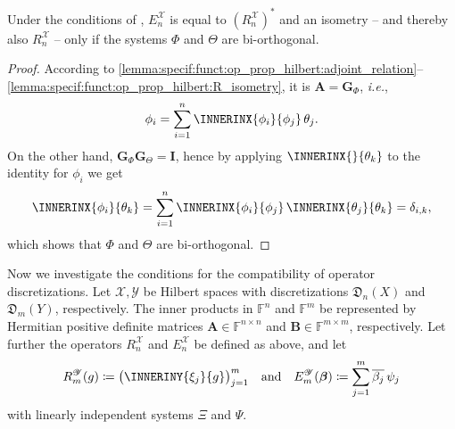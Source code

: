 \documentclass[a4paper]{paper}
\newcommand*{\SPC}[1]{{\ensuremath{\mathscr{#1}}}}
\newcommand*{\SPCX}{\SPC{X}}
\newcommand*{\SPCY}{\SPC{Y}}
\newcommand{\FIELD}{{\ensuremath{\mathbb{F}}}}
\newcommand*{\Fn}{{\ensuremath{\FIELD^n}}}
\newcommand*{\Fm}{{\ensuremath{\FIELD^m}}}
\newcommand*{\Fnxn}{{\ensuremath{\FIELD^{n \times n}}}}
\newcommand*{\Fmxm}{{\ensuremath{\FIELD^{m \times m}}}}
\newcommand*{\EXT}[2]{\ensuremath{E_{#1}^{#2}}}
\newcommand*{\REST}[2]{\ensuremath{R_{#1}^{#2}}}
\newcommand*{\RnX}{{\ensuremath{\REST{n}{\SPC{X}}}}}
\newcommand*{\RmY}{{\ensuremath{\REST{m}{\SPC{Y}}}}}
\newcommand*{\EnX}{{\ensuremath{\EXT{n}{\SPC{X}}}}}
\newcommand*{\EmY}{{\ensuremath{\EXT{m}{\SPC{Y}}}}}
\newcommand*{\DISCR}[2]{{\ensuremath{\mathfrak{D}_{#2}(#1)}}}
\newcommand*{\DISCRnX}{\DISCR{X}{n}}
\newcommand*{\DISCRmY}{\DISCR{Y}{m}}
\newcommand{\ie}{\textsl{i.e.}\xspace}
\newcommand{\vbeta}{\boldsymbol{\beta}}
\newcommand{\vA}{\boldsymbol{A}}
\newcommand{\vB}{\boldsymbol{B}}
\newcommand{\vG}{\boldsymbol{G}}
\newcommand{\vI}{\boldsymbol{I}}
\begin{document}
\begin{corollary} 
 Under the conditions of , $\EnX$ is equal to $(\RnX)^*$ and 
 an isometry -- and thereby also $\RnX$ -- only if the systems $\Phi$ and $\Theta$ are bi-orthogonal.
\end{corollary}
\vspace{1em}


\begin{proof}
 According to 
 \eqref{lemma:specif:funct:op_prop_hilbert:adjoint_relation}--\eqref{lemma:specif:funct:op_prop_hilbert:R_isometry},
 it is $\vA = \vG_\Phi$, \ie,
 \begin{equation*}
  \phi_i = \sum_{i=1}^n \INNERINX{\phi_i}{\phi_j}\, \theta_j.
 \end{equation*}
 On the other hand, $\vG_\Phi \vG_\Theta = \vI$, hence by applying $\INNERINX{}{\theta_k}$ to the identity 
 for $\phi_i$ we get
 \begin{equation*}
  \INNERINX{\phi_i}{\theta_k} 
  = \sum_{i=1}^n \INNERINX{\phi_i}{\phi_j}\, \INNERINX{\theta_j}{\theta_k} = \delta_{i,k},
 \end{equation*}
 which shows that $\Phi$ and $\Theta$ are bi-orthogonal.
\end{proof}


Now we investigate the conditions for the compatibility of operator discretizations. Let $\SPCX, \SPCY$ be Hilbert 
spaces with discretizations $\DISCRnX$ and $\DISCRmY$, respectively. The inner products in 
$\Fn$ and $\Fm$ be represented by Hermitian positive definite matrices $\vA \in \Fnxn$ and $\vB 
\in \Fmxm$, respectively. 
Let further the operators $\RnX$ and $\EnX$ be defined as above, and let
%
\begin{equation*}
 \RmY(g) \coloneqq  \big( \INNERINY{\xi_j}{g} \big)_{j=1}^m
 \quad \text{and} \quad
 \EmY(\vbeta) \coloneqq  \sum_{j=1}^m \overline{\beta_j}\, \psi_j
\end{equation*}
%
with linearly independent systems $\Xi$ and $\Psi$.
\end{document}
